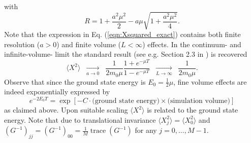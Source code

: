 \documentclass[11pt]{article}
\begin{document}
with
\begin{equation}
R = 1+\frac{a^2\mu^2}{2}-a\mu\sqrt{1+\frac{a^2\mu^2}{4}}.
\end{equation}
Note that the expression in Eq. (\ref{eqn:Xsquared_exact}) contains both finite resolution ($a>0$) and finite volume ($L<\infty$) effects. In the continuum- and infinite-volume- limit the standard result (see e.g. Section 2.3 in \cite{Sakurai1994}) is recovered
\begin{equation}
\langle X^2\rangle\;\; \underset{a\rightarrow 0}{\longrightarrow}\;\;
 \frac{1}{2m_0\mu}\frac{1+e^{-\mu T}}{1-e^{-\mu T}}\;\; \underset{L\rightarrow \infty}{\longrightarrow}\;\;\frac{1}{2m_0 \mu}.\label{eqn:Xsquared_continuum}
\end{equation}
Observe that since the ground state energy is $E_0=\frac{1}{2}\mu$, fine volume effects are indeed exponentially expressed by
\begin{equation}
e^{-2E_0T} = \exp\left[-C\cdot \text{(ground state energy)}\times\text{(simulation volume)}\right]
\end{equation}
as claimed above. Upon suitable scaling $\langle X^2\rangle$ is related to the ground state energy. Note that due to translational invariance $\langle X_j^2\rangle =\langle X_0^2\rangle$ and $\left(G^{-1}\right)_{jj}=\left(G^{-1}\right)_{00}=\frac{1}{M}\operatorname{trace}\left(G^{-1}\right)$ for any $j=0,\dots,M-1$.
\end{document}
